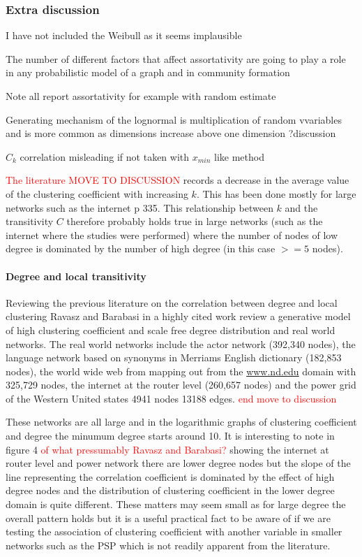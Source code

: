 \subsubsection{Extra discussion}

I have not included the Weibull as it seems implausible

The number of different factors that affect assortativity are going to play a role in any probabilistic model of a graph and in community formation

Note all report assortativity for example with random estimate

Generating mechanism of the lognormal is multiplication of random vvariables and is more common as dimensions increase above one dimension \cite{} ?discussion \cite{koch1966logarithm}
\cite{limpert2001log}

$C_k$ correlation misleading if not taken with $x_{min}$ like method

\textcolor{red}{The literature MOVE TO DISCUSSION} records a decrease in the average value of the clustering coefficient with increasing $k$. This has been done mostly for large networks such as the internet \cite{newman2018networks} p 335.
This relationship between $k$ and the transitivity $C$ therefore probably holds true in large networks (such as the internet where the studies were performed) where the number of nodes of low degree is dominated by the number of high degree (in this case $>=5$ nodes). 

\paragraph{Degree and local transitivity}
\label{sec:discuss degree and local transitivity - summary just now}
Reviewing the previous literature on the correlation between degree and local clustering Ravasz and Barabasi in a highly cited work \cite{ravasz2002hierarchical} review a generative model of high clustering coefficient and scale free degree distribution and real world networks. The real world networks include the actor network (392,340 nodes), the language network based on synonyms in Merriams English dictionary (182,853 nodes), the world wide web from mapping out from the \url{www.nd.edu} domain with 325,729 nodes, the internet at the router level (260,657 nodes) and the power grid of the Western United states 4941 nodes 13188 edges. \textcolor{red}{end move to discussion}

These networks are all large and in the logarithmic graphs of clustering coefficient and degree the minumum degree starts around 10. It is interesting to note in figure 4 \textcolor{red}{of what pressumably Ravasz and Barabasi?} showing the internet at router level and power network there are lower degree nodes but the slope of the line representing the correlation coefficient is dominated by the effect of high degree nodes and the distribution of clustering coefficient in the lower degree domain is quite different. These matters may seem small as for large degree the overall pattern holds but it is a useful practical fact to be aware of if we are testing the association of clustering coefficient with another variable in smaller networks such as the PSP which is not readily apparent from the literature.

